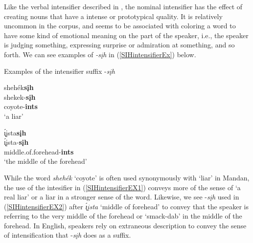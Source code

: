 \label{suffixintensifierredux}

Like the verbal intensifier described in , the nominal intensifier has the effect of creating nouns that have a intense or prototypical quality. It is relatively uncommon in the corpus, and seems to be associated with coloring a word to have some kind of emotional meaning on the part of the speaker, i.e., the speaker is judging something, expressing surprise or admiration at something, and so forth. We can see examples of \textit{-sįh} in (\ref{SIHintensifierEx}) below.

\begin{exe}

\item\label{SIHintensifierEx} Examples of the intensifier suffix -\textit{sįh}

\begin{xlist}

\item\label{SIHintensifierEX1} \glll shehék\textbf{sįh}\\
    shekek-\textbf{sįh}\\
    \textnormal{coyote}-\textbf{ints}\\
    \glt `a liar' \citep[206]{hollow1970}
    
\item\label{SIHintensifierEX2} \glll \'{ı̨}įsta\textbf{sįh}\\
    \'{ı̨}įsta-\textbf{sįh}\\
    \textnormal{middle.of.forehead}-\textbf{ints}\\
    \glt `the middle of the forehead' \citep[131]{hollow1973a}
    
\end{xlist}


\end{exe}

While the word \textit{shehék} `coyote' is often used synonymously with `liar' in Mandan, the use of the intesifier in (\ref{SIHintensifierEX1}) conveys more of the sense of `a real liar' or a liar in a stronger sense of the word. Likewise, we see -\textit{sįh} used in (\ref{SIHintensifierEX2}) after \textit{\'{ı̨}įsta} `middle of forehead' to convey that the speaker is referring to the very middle of the forehead or `smack-dab' in the middle of the forehead. In English, speakers rely on extraneous description to convey the sense of intensification that -\textit{sįh} does as a suffix.

